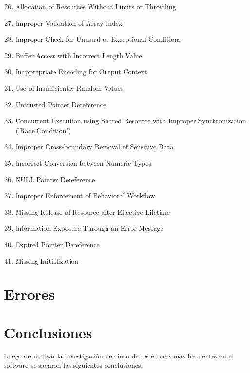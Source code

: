 \documentclass[a4paper,10pt]{article}
\begin{document}
\begin{enumerate}
 \setcounter{enumi}{25}
 \item Allocation of Resources Without Limits or Throttling
 \item Improper Validation of Array Index
 \item Improper Check for Unusual or Exceptional Conditions
 \item Buffer Access with Incorrect Length Value
 \item Inappropriate Encoding for Output Context
 \item Use of Insufficiently Random Values
 \item Untrusted Pointer Dereference
 \item Concurrent Execution using Shared Resource with Improper Synchronization ('Race Condition')
 \item Improper Cross-boundary Removal of Sensitive Data
 \item Incorrect Conversion between Numeric Types
 \item NULL Pointer Dereference
 \item Improper Enforcement of Behavioral Workflow
 \item Missing Release of Resource after Effective Lifetime
 \item Information Exposure Through an Error Message
 \item Expired Pointer Dereference
 \item Missing Initialization
\end{enumerate}

\clearpage
\section{Errores}











\clearpage
\section{Conclusiones}

Luego de realizar la investigación de cinco de los errores más frecuentes en el software se sacaron las siguientes
conclusiones.
\end{document}
